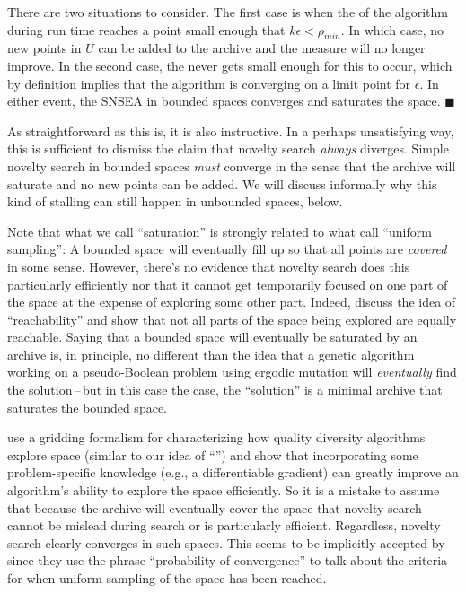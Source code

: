 \documentclass[twoside]{article}
\begin{document}
There are two situations to consider.  The first case is when the  of the algorithm during run time reaches a point small enough that $k\epsilon < \rho_{min}$.  In which case, no new points in $U$ can be added to the archive and the  measure will no longer improve.  In the second case, the  never gets small enough for this to occur, which by definition implies that the algorithm is converging on a limit point for $\epsilon$.  In either event, the SNSEA in bounded spaces converges and saturates the space. $\blacksquare$

\vspace*{1ex}

As straightforward as this is, it is also instructive.  In a perhaps unsatisfying way, this is sufficient to dismiss the claim that novelty search \emph{always} diverges.  Simple novelty search in bounded spaces \emph{must} converge in the sense that the archive will saturate and no new points can be added.  We will discuss informally why this kind of stalling can still happen in unbounded spaces, below.

Note that what we call ``saturation'' is strongly related to what \citet{Doncieux2019gecco} call ``uniform sampling'':  A bounded space will eventually fill up so that all points are \emph{covered} in some sense.  However, there's no evidence that novelty search does this particularly efficiently nor that it cannot get temporarily focused on one part of the space at the expense of exploring some other part. Indeed, \citet{Doncieux2019gecco} discuss the idea of ``reachability'' and show that not all parts of the space being explored are equally reachable.  Saying that a bounded space will eventually be saturated by an archive is, in principle, no different than the idea that a genetic algorithm working on a pseudo-Boolean problem using ergodic mutation will \emph{eventually} find the solution\,--\,but in this case the case, the ``solution'' is a minimal  archive that saturates the bounded space.

 \citet{Fontaine2021corr} use a gridding formalism for characterizing how quality diversity algorithms explore space (similar to our idea of ``'') and show that incorporating some problem-specific knowledge (e.g., a differentiable gradient) can greatly improve an algorithm's ability to explore the space efficiently.  So it is a mistake to assume that because the archive will eventually cover the space that novelty search cannot be mislead during search or is particularly efficient.  Regardless, novelty search clearly converges in such spaces.  This seems to be implicitly accepted by \citet{Doncieux2019gecco} since they use the phrase ``probability of convergence'' to talk about the criteria for when uniform sampling of the space has been reached.
\end{document}
